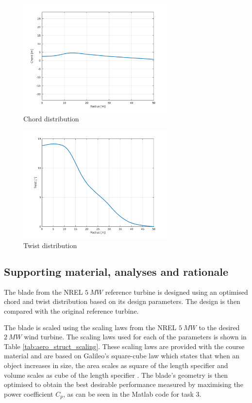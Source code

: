 \begin{figure}[H]
\centering
\includegraphics[width=0.7\textwidth]{Images/chord.png} 
\caption{Chord distribution}\label{fig:chord}
\end{figure}

\begin{figure}[H]
\centering
\includegraphics[width=0.7\textwidth]{Images/twist.png} 
\caption{Twist distribution}\label{fig:twist}
\end{figure}


\subsection{Supporting material, analyses and rationale}
The blade from the NREL $5\ MW$ reference turbine \cite{5MW} is designed using an optimised chord and twist distribution based on its design parameters. The design is then compared with the original reference turbine.

The blade is scaled using the scaling laws from the NREL $5\ MW$ to the desired $2\ MW$ wind turbine. The scaling laws used for each of the parameters is shown in Table \ref{tab:aero_struct_scaling}. These scaling laws are provided with the course material \cite{scaling_laws} and are based on Galileo's square-cube law which states that when an object increases in size, the area scales as square of the length specifier and volume scales as cube of the length specifier \cite{galileo}. The blade's geometry is then optimised to obtain the best desirable performance measured by maximising the power coefficient $C_p$, as can be seen in the Matlab code for task 3.

